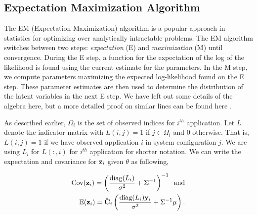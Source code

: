 \subsection{Expectation Maximization Algorithm}
\label{sec:EMalg}
The EM (Expectation Maximization) algorithm is a popular approach in
statistics for optimizing over analytically intractable problems.
The EM algorithm switches between two steps: \emph{expectation} (E)
and \emph{maximization} (M) until convergence. During the E step, a
function for the expectation of the log of the likelihood is found
using the current estimate for the parameters.  In the M step, we
compute parameters maximizing the expected log-likelihood found on the
E step. These parameter estimates are then used to determine the
distribution of the latent variables in the next E step.  We have left
out some details of the algebra here, but a more detailed proof on
similar lines can be found here \cite{yu2005learning}.

As described earlier, $\Omega_i$ is the set of observed indices for
$i^{th}$ application. Let $L$ denote the indicator matrix with $L(i,j)
= 1$ if $j \in \Omega_i$
and $0$ otherwise. That is, $L(i,j) = 1$ if we have observed application $i$ in system configuration $j$.  We are using $L_i$ for $L(:,i)$ for $i^{th}$ application for shorter notation. We can write the expectation and covariance for $\mathbf{z}_i$ given $\theta$ as following,

\begin{equation}
\begin{aligned}
\label{eq:expectation}
 \text{Cov}(\mathbf{z}_i) =  \left( \frac{\text{diag}(L_i)}{\sigma^2} +\Sigma^{-1} \right)^{-1} \;\; \text{and} \\
 \mathbb{E}(\mathbf{z}_i) = \hat{\mathbf{C}}_i \left(  \frac{\text{diag}(L_i) \mathbf{y}_i}{\sigma^2} +  \Sigma^{-1} \mu  \right).
 \end{aligned}
\end{equation}

